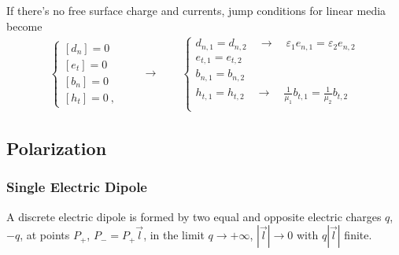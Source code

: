 \documentclass[letterpaper,10pt,english]{jupyterBook}
\begin{document}
\sphinxAtStartPar
If there’s no free surface charge and currents, jump conditions for linear media become
\begin{equation}\label{equation:ch/principles-matter:eq:em-jump:no-surf-density}
\begin{split}\begin{cases}
  [ d_n ] = 0 \\
  [ e_t ] = 0 \\
  [ b_n ] = 0 \\
  [ h_t ] = 0 \ ,
\end{cases}
\qquad \rightarrow \qquad
\begin{cases}
  d_{n,1} = d_{n,2}  \quad \rightarrow \quad \varepsilon_1 e_{n,1} = \varepsilon_2 e_{n,2} \\
  e_{t,1} = e_{t,2}  \\
  b_{n,1} = b_{n,2}  \\
  h_{t,1} = h_{t,2}  \quad \rightarrow \quad \frac{1}{\mu_1} b_{t,1} = \frac{1}{\mu_2} b_{t,2} \\
\end{cases}
\end{split}
\end{equation}
\sphinxstepscope


\subsection{Polarization}
\label{\detokenize{ch/principles-matter-polarization:polarization}}\label{\detokenize{ch/principles-matter-polarization:classical-electromagnetism-media-polarization}}\label{\detokenize{ch/principles-matter-polarization::doc}}

\subsubsection{Single Electric Dipole}
\label{\detokenize{ch/principles-matter-polarization:single-electric-dipole}}
\sphinxAtStartPar
A discrete electric dipole is formed by two equal and opposite electric charges \(q\), \(-q\), at points \(P_+\), \(P_- = P_+ \vec{l}\), in the limit \(q \rightarrow +\infty\), \(|\vec{l}| \rightarrow 0\) with \(q |\vec{l}|\) finite.
\end{document}
